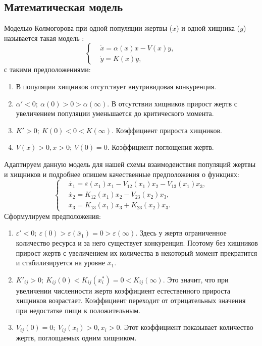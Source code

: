 \subsection{Математическая модель}
    Моделью Колмогорова при одной популяции жертвы (\(x\)) и одной хищника (\(y\)) называется такая модель \cite{svilog}:
    \[
        \left\{\begin{split}
            & \dot{x} = \alpha(x)x - V(x) y, \\
            & \dot{y} = K(x) y,
        \end{split}\right.
    \]
    с такими предположениями:
    
    \begin{enumerate}
        \item В популяции хищников отсутствует внутривидовая конкуренция.
        \item \( \alpha' < 0; ~ \alpha(0) > 0 > \alpha(\infty) \). В отсутствии хищников прирост жертв с увеличением популяции уменьшается до критического момента.
        \item \( K' > 0; ~ K(0) < 0 < K(\infty) \). Коэффициент прироста хищников.
        \item \( V(x) > 0, x > 0; ~ V(0) = 0 \). Коэффициент поглощения жертв.
    \end{enumerate}

    Адаптируем данную модель для нашей схемы взаимодеиствия популяций жертвы и хищников и подробнее опишем качественные предположения о функциях:
    \[
        \left\{\begin{split}
            & \dot{x_1} = \varepsilon(x_1)x_1 - V_{12}(x_1)x_2 - V_{13}(x_1)x_3, \\
            & \dot{x_2} = K_{12}(x_1)x_2 - V_{23}(x_2)x_3, \\
            & \dot{x_3} = K_{13}(x_1)x_3 + K_{23}(x_2)x_3. 
        \end{split}\right.
    \]
    Сформулируем предположения:
    \begin{enumerate}
        \item \( \varepsilon' < 0; ~ \varepsilon(0) > \varepsilon(\bar{x}_1) = 0 > \varepsilon(\infty)\). Здесь у жертв ограниченное количество ресурса и за него существует конкуренция. Поэтому без хищников прирост жертв с увеличением их количества в некоторый момент прекратится и стабилизируется на уровне \( \bar{x}_1 \).
        \item \( K'_{ij} > 0; ~ K_{ij}(0) < K_{ij}(x_i^*) = 0 < K_{ij} (\infty) \). Это значит, что при увеличении численности жертв коэффициент естественного прироста хищников возрастает. Коэффициент переходит от отрицательных значения при недостатке пищи к положительным.
        \item \( V_{ij}(0) = 0; ~ V_{ij} (x_i) > 0, x_i > 0 \). Этот коэффициент показывает количество жертв, поглощаемых одним хищником.
    \end{enumerate}

